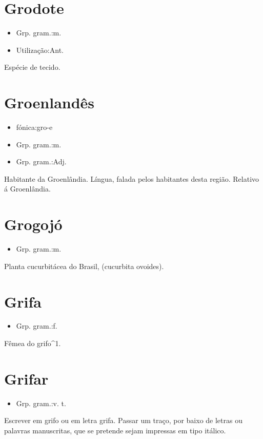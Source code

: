 \section{Grodote}
\begin{itemize}
\item {Grp. gram.:m.}
\end{itemize}
\begin{itemize}
\item {Utilização:Ant.}
\end{itemize}
Espécie de tecido.
\section{Groenlandês}
\begin{itemize}
\item {fónica:gro-e}
\end{itemize}
\begin{itemize}
\item {Grp. gram.:m.}
\end{itemize}
\begin{itemize}
\item {Grp. gram.:Adj.}
\end{itemize}
Habitante da Groenlândia.
Língua, falada pelos habitantes desta região.
Relativo á Groenlândia.
\section{Grogojó}
\begin{itemize}
\item {Grp. gram.:m.}
\end{itemize}
Planta cucurbitácea do Brasil, (\textunderscore cucurbita ovoides\textunderscore ).
\section{Grifa}
\begin{itemize}
\item {Grp. gram.:f.}
\end{itemize}
Fêmea do grifo^1.
\section{Grifar}
\begin{itemize}
\item {Grp. gram.:v. t.}
\end{itemize}
Escrever em grifo ou em letra grifa.
Passar um traço, por baixo de letras ou palavras manuscritas, que se pretende sejam impressas em tipo itálico.
